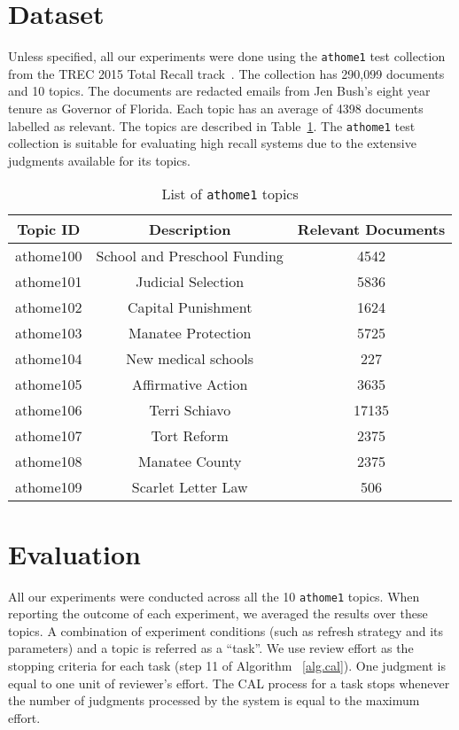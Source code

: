\label{chap:dataset}

\section{Dataset}
Unless specified, all our experiments were done using the \texttt{athome1} test
collection from the TREC 2015 Total Recall track~\cite{roegiest2015trec}. The
collection has 290,099 documents and 10 topics. The documents are redacted
emails from Jen Bush's eight year tenure as Governor of Florida. Each topic has
an average of 4398 documents labelled as relevant. The topics are described in
Table~\ref{tab:topics}. The \texttt{athome1} test collection is suitable for
evaluating high recall systems due to the extensive judgments available for its
topics.

\begin{table}[h]
\centering
\caption{List of \texttt{athome1} topics}
\label{tab:topics}
\begin{tabular}{|c|c|c|}
\hline
\textbf{Topic ID} & \textbf{Description} & \textbf{Relevant Documents} \\ \hline \hline
athome100 & School and Preschool Funding & 4542 \\ \hline
athome101 & Judicial Selection & 5836 \\ \hline
athome102 & Capital Punishment & 1624 \\ \hline
athome103 & Manatee Protection & 5725 \\ \hline
athome104 & New medical schools & 227 \\ \hline
athome105 & Affirmative Action & 3635 \\ \hline
athome106 & Terri Schiavo & 17135 \\ \hline
athome107 & Tort Reform & 2375 \\ \hline
athome108 & Manatee County & 2375 \\ \hline
athome109 & Scarlet Letter Law & 506 \\ \hline
\end{tabular}
\end{table}


\section{Evaluation}
\label{sec:eval}

All our experiments were conducted across all the 10 \texttt{athome1} topics.
When reporting the outcome of each experiment, we averaged the results over
these topics. A combination of experiment conditions (such as refresh strategy
and its parameters) and a topic is referred as
a ``task''. We use review effort as the stopping criteria for each task (step 11
of Algorithm ~\ref{alg.cal}). One judgment is equal to one unit of reviewer's
effort. The CAL process for a task stops whenever the number of judgments
processed by the system is equal to the maximum effort.

